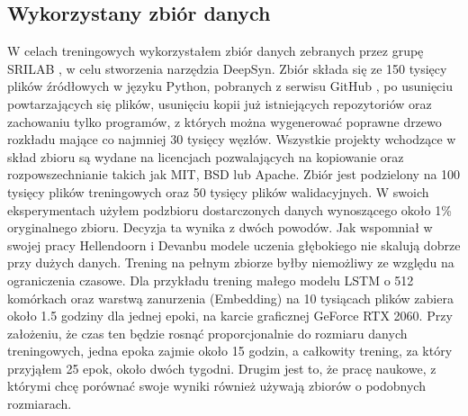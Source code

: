 \subsection {Wykorzystany zbiór danych}
\label{sec:dataset-background}
W celach treningowych wykorzystałem zbiór danych zebranych przez grupę SRILAB \cite{dataset}, w celu stworzenia narzędzia 
DeepSyn. Zbiór składa się ze 150 tysięcy plików źródłowych w języku Python, pobranych z serwisu GitHub \cite{github}, po 
usunięciu powtarzających się plików, usunięciu kopii już istniejących repozytoriów oraz zachowaniu tylko programów, z których
można wygenerować poprawne drzewo rozkładu mające co najmniej 30 tysięcy węzłów. Wszystkie projekty wchodzące w skład 
zbioru są wydane na licencjach pozwalających na kopiowanie oraz rozpowszechnianie takich jak MIT, BSD lub Apache. Zbiór jest 
podzielony na 100 tysięcy plików treningowych oraz 50 tysięcy plików walidacyjnych. W swoich eksperymentach użyłem podzbioru 
dostarczonych danych wynoszącego około 1\% oryginalnego zbioru. Decyzja ta wynika z dwóch powodów. Jak wspomniał w swojej 
pracy Hellendoorn i Devanbu\cite{hellendoorn} modele uczenia głębokiego nie skalują dobrze przy dużych danych. Trening na 
pełnym zbiorze byłby niemożliwy ze względu na ograniczenia czasowe. Dla przykładu trening małego modelu LSTM o 512 komórkach 
oraz warstwą zanurzenia (Embedding) na 10 tysiącach plików zabiera około 1.5 godziny dla jednej epoki, na karcie graficznej GeForce RTX 2060. 
Przy założeniu, że czas ten będzie rosnąć proporcjonalnie do rozmiaru danych treningowych, jedna epoka zajmie 
około 15 godzin, a całkowity trening, za który przyjąłem 25 epok, około dwóch tygodni. Drugim jest to, że pracę naukowe, z 
którymi chcę porównać swoje wyniki również używają zbiorów o podobnych rozmiarach. 


